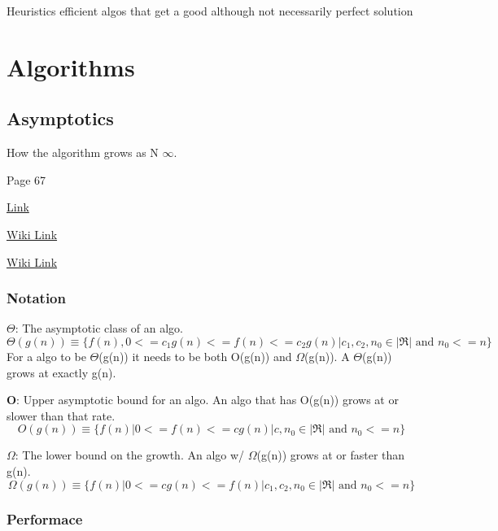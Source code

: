 Heuristics \ra efficient algos that get a good although not necessarily perfect solution
\chapter{Algorithms}
\section{Asymptotics}
How the algorithm grows as N \ra $\infty$.

 Page 67

\href{http://www.cs.umd.edu/~mount/251/Lects/251lects.pdf}{Link}

\href{https://en.wikipedia.org/wiki/Big_O_notation}{Wiki Link}

\href{https://en.wikipedia.org/wiki/Time_complexity#Constant_time}{Wiki Link}

\subsection{Notation}
	\textbf{$\Theta$}: The asymptotic class of an algo. 
	\begin{equation}
		\Theta(g(n)) \equiv \bigg\{f(n), 0<=c_1g(n)<=f(n)<=c_2g(n) | c_1, c_2, n_0 \in |\Re| \textrm{ and } n_0 <= n \bigg\}
	\end{equation}
	For a algo to be $\Theta$(g(n)) it needs to be both O(g(n)) and $\Omega$(g(n)). A $\Theta$(g(n)) grows at exactly g(n).

	\hspace{11pt}
	
	\textbf{O}: Upper asymptotic bound for an algo. An algo that has O(g(n)) grows at or slower than that rate. 
		\begin{equation}
			O(g(n)) \equiv \bigg\{f(n) | 0<= f(n) <=cg(n) | c, n_0 \in |\Re| \textrm{ and } n_0 <= n \bigg\}
		\end{equation}

	\hspace{11pt}

	\textbf{$\Omega$}: The lower bound on the growth. An algo w/ $\Omega$(g(n)) grows at or faster than g(n). 
		\begin{equation}
			\Omega(g(n)) \equiv \bigg\{f(n) | 0 <= cg(n) <= f(n) | c_1, c_2, n_0 \in |\Re| \textrm{ and } n_0 <= n \bigg\}
		\end{equation}

		\subsection{Performace}
